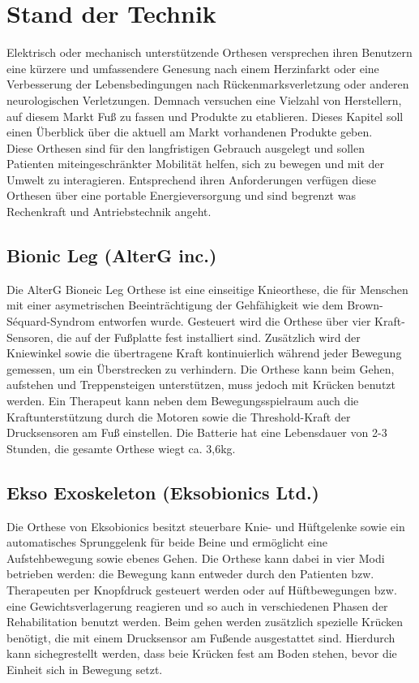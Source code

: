 \chapter{Stand der Technik}
Elektrisch oder mechanisch unterstützende Orthesen versprechen ihren Benutzern eine kürzere und umfassendere Genesung nach einem Herzinfarkt oder eine Verbesserung der Lebensbedingungen nach Rückenmarksverletzung oder anderen neurologischen Verletzungen\citep{Taub.1993,Hesse.2003}. Demnach versuchen eine Vielzahl von Herstellern, auf diesem Markt Fuß zu fassen und Produkte zu etablieren. Dieses Kapitel soll einen Überblick über die aktuell am Markt vorhandenen Produkte geben.\\
Diese Orthesen sind für den langfristigen Gebrauch ausgelegt und sollen Patienten miteingeschränkter Mobilität helfen, sich zu bewegen und mit der Umwelt zu interagieren. Entsprechend ihren Anforderungen verfügen diese Orthesen über eine portable Energieversorgung und sind begrenzt was Rechenkraft und Antriebstechnik angeht. \\


\section{Bionic Leg (AlterG inc.)}  
Die AlterG Bioneic Leg Orthese ist eine einseitige Knieorthese\citep{Bishop.2012}, die für Menschen mit einer asymetrischen Beeinträchtigung der Gehfähigkeit wie dem Brown-Séquard-Syndrom entworfen wurde. Gesteuert wird die Orthese über vier Kraft-Sensoren, die auf der Fußplatte fest installiert sind. Zusätzlich wird der Kniewinkel sowie die übertragene Kraft kontinuierlich während jeder Bewegung gemessen, um ein Überstrecken zu verhindern. Die Orthese kann beim Gehen, aufstehen und Treppensteigen unterstützen, muss jedoch mit Krücken benutzt werden. Ein Therapeut kann neben dem Bewegungsspielraum auch die Kraftunterstützung durch die Motoren sowie die Threshold-Kraft der Drucksensoren am Fuß einstellen. Die Batterie hat eine Lebensdauer von 2-3 Stunden, die gesamte Orthese wiegt ca. 3,6kg.

\section{Ekso Exoskeleton (Eksobionics Ltd.)} 
Die Orthese von Eksobionics besitzt steuerbare Knie- und Hüftgelenke sowie ein automatisches Sprunggelenk für beide Beine und ermöglicht eine Aufstehbewegung sowie ebenes Gehen\citep{Strausser.2011}. Die Orthese kann dabei in vier Modi betrieben werden: die Bewegung kann entweder durch den Patienten bzw. Therapeuten per Knopfdruck gesteuert werden oder auf Hüftbewegungen bzw. eine Gewichtsverlagerung reagieren und so auch in verschiedenen Phasen der Rehabilitation benutzt werden. Beim gehen werden zusätzlich spezielle Krücken benötigt, die mit einem Drucksensor am Fußende ausgestattet sind. Hierdurch kann sichegrestellt werden, dass beie Krücken fest am Boden stehen, bevor die Einheit sich in Bewegung setzt. 


